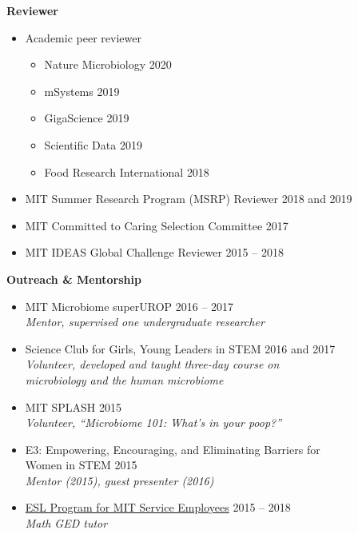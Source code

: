 \documentclass[10pt]{article}
\renewcommand{\section}[1]{\pagebreak[3]%
    \hyphenpenalty=10000%
    \vspace{1.3\baselineskip}%
    \phantomsection\addcontentsline{toc}{section}{#1}%
    \noindent\llap{\scshape\smash{\parbox[t]{\marginparwidth}{\raggedright #1}}}%
    \vspace{-\baselineskip}\par}
\newenvironment{outerlist}[1][\enskip\textbullet]%
        {\begin{itemize}[#1,leftmargin=*]}{\end{itemize}%
         \vspace{-.6\baselineskip}}
\newenvironment{innerlist}[1][\enskip\textbullet]%
        {\begin{itemize}[#1,leftmargin=*,parsep=0pt,itemsep=0pt,topsep=0pt,partopsep=0pt]}
        {\end{itemize}}
\begin{document}
\textbf{Reviewer}
\begin{outerlist}
	\item[] Academic peer reviewer

		\begin{innerlist}
		
			\item[] Nature Microbiology \hfill {2020}
			\item[] mSystems \hfill {2019}
			\item[] GigaScience \hfill {2019}
			\item[] Scientific Data \hfill {2019}
			\item[] Food Research International \hfill {2018}
		
		\end{innerlist}
	
	
	\item[] MIT Summer Research Program (MSRP) Reviewer \hfill {2018 and 2019} 
	\item[] MIT Committed to Caring Selection Committee \hfill {2017} 
	\item[] MIT IDEAS Global Challenge Reviewer \hfill {2015 -- 2018} 
	\end{outerlist}
\vspace{.15in}

\textbf{Outreach \& Mentorship}
\begin{outerlist}
	\item[] MIT Microbiome superUROP \hfill {2016 -- 2017} \\
	\textit{Mentor, supervised one undergraduate researcher}

	\item[] Science Club for Girls, Young Leaders in STEM \hfill {2016 and 2017} \\ \textit{Volunteer, developed and taught three-day course on} \\ \textit{microbiology and the human microbiome} 
	\item[] MIT SPLASH \hfill 2015 \\
	\textit{Volunteer, ``Microbiome 101: What's in your poop?''}
	\item[] E3: Empowering, Encouraging, and Eliminating Barriers for \\ Women in STEM \hfill 2015 \\
	\textit{Mentor (2015), guest presenter (2016)}
\item[] \href{https://hr.mit.edu/learn/esl}{ESL Program for MIT Service Employees} \hfill {2015 -- 2018} \\
\textit{Math GED tutor}
\end{outerlist}
\vspace{.15in}


%
\end{document}
